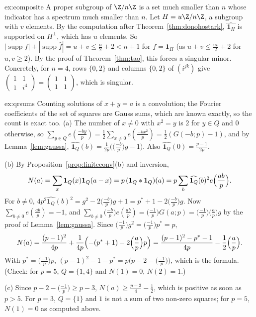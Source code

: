 \begin{solution}{ex:composite}
\idea A proper subgroup of $\Z/n\Z$ is a set much smaller than $n$ whose indicator has a spectrum much smaller than $n$.
\writeup Let $H=u\Z/n\Z$, a subgroup with $v$ elements. By the computation after Theorem~\ref{thm:donohostark}, $\widehat{\mathbf 1_H}$ is supported on $H^\perp$, which has $u$ elements. So
$|\operatorname{supp}f|+|\operatorname{supp}\hat f|=u+v\le\frac n2+2<n+1$ for $f=\mathbf 1_H$ (as $u+v\le\frac{uv}2+2$ for $u,v\ge2$). By the proof of Theorem~\ref{thm:tao}, this forces a singular minor.
Concretely, for $n=4$, rows $\{0,2\}$ and columns $\{0,2\}$ of $(i^{jk})$ give $\begin{pmatrix}1&1\\1&i^4\end{pmatrix}=\begin{pmatrix}1&1\\1&1\end{pmatrix}$, which is singular.
\end{solution}

\begin{solution}{ex:qrsums}
\idea Counting solutions of $x+y=a$ is a convolution; the Fourier coefficients of the set of squares are Gauss sums, which are known
exactly, so the count is exact too.
\writeup (a) The number of $x\ne0$ with $x^2=y$ is $2$ for $y\in Q$ and $0$ otherwise, so $\sum_{y\in Q}e(\frac{-by}p)=\frac12\sum_{x\ne0}e(\frac{-bx^2}p)=\frac12(G(-b;p)-1)$, and by
Lemma~\ref{lem:gaussa}, $\widehat{\mathbf 1_Q}(b)=\frac1{2p}\bigl(\bigl(\frac{-b}p\bigr)g-1\bigr)$. Also $\widehat{\mathbf 1_Q}(0)=\frac{p-1}{2p}$.

(b) By Proposition~\ref{prop:finiteconv}(b) and inversion,
\[N(a)=\sum_x\mathbf 1_Q(x)\mathbf 1_Q(a-x)=p\,(\mathbf 1_Q*\mathbf 1_Q)(a)=p\sum_b\widehat{\mathbf 1_Q}(b)^2e\Bigl(\frac{ab}p\Bigr).\]
For $b\ne0$,
$4p^2\widehat{\mathbf 1_Q}(b)^2=g^2-2\bigl(\frac{-b}p\bigr)g+1=p^*+1-2\bigl(\frac{-b}p\bigr)g$. Now $\sum_{b\ne0}e(\frac{ab}p)=-1$, and $\sum_{b\ne0}\bigl(\frac{-b}p\bigr)e(\frac{ab}p)=\bigl(\frac{-1}p\bigr)G(a;p)=\bigl(\frac{-1}p\bigr)\bigl(\frac ap\bigr)g$
by the proof of Lemma~\ref{lem:gaussa}. Since $\bigl(\frac{-1}p\bigr)g^2=\bigl(\frac{-1}p\bigr)p^*=p$,
\[N(a)=\frac{(p-1)^2}{4p}+\frac1{4p}\Bigl(-(p^*+1)-2\Bigl(\frac ap\Bigr)p\Bigr)=\frac{(p-1)^2-p^*-1}{4p}-\frac12\Bigl(\frac ap\Bigr).\]
With $p^*=\bigl(\frac{-1}p\bigr)p$, $(p-1)^2-1-p^*=p\bigl(p-2-\bigl(\frac{-1}p\bigr)\bigr)$, which is the formula. (Check: for $p=5$, $Q=\{1,4\}$ and $N(1)=0$, $N(2)=1$.)

(c) Since $p-2-\bigl(\frac{-1}p\bigr)\ge p-3$, $N(a)\ge\frac{p-3}4-\frac12$, which is positive as soon as $p>5$. For $p=3$, $Q=\{1\}$ and $1$ is not a sum of two non-zero
squares; for $p=5$, $N(1)=0$ as computed above.
\end{solution}


